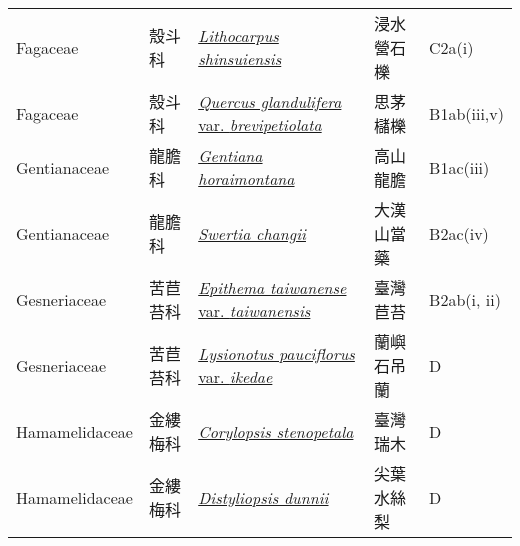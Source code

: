 {\begin{longtable}{L{2.5cm}L{2cm}L{5cm}L{2.5cm}L{3cm}}
    Fagaceae & 殼斗科 & \href{http://www.theplantlist.org/tpl1.1/search?q=Lithocarpus+shinsuiensis}{\textit{Lithocarpus shinsuiensis} } & 浸水營石櫟 & C2a(i)    \\
    Fagaceae & 殼斗科 & \href{http://www.theplantlist.org/tpl1.1/search?q=Quercus+glandulifera+var.+brevipetiolata}{\textit{Quercus glandulifera} var. \textit{brevipetiolata} } & 思茅櫧櫟 & B1ab(iii,v)    \\
    Gentianaceae & 龍膽科 & \href{http://www.theplantlist.org/tpl1.1/search?q=Gentiana+horaimontana}{\textit{Gentiana horaimontana} } & 高山龍膽 & B1ac(iii)    \\
    Gentianaceae & 龍膽科 & \href{http://www.theplantlist.org/tpl1.1/search?q=Swertia+changii}{\textit{Swertia changii} } & 大漢山當藥 & B2ac(iv)    \\
    Gesneriaceae & 苦苣苔科 & \href{http://www.theplantlist.org/tpl1.1/search?q=Epithema+taiwanense+var.+taiwanensis}{\textit{Epithema taiwanense} var. \textit{taiwanensis} } & 臺灣苣苔 & B2ab(i, ii)    \\
    Gesneriaceae & 苦苣苔科 & \href{http://www.theplantlist.org/tpl1.1/search?q=Lysionotus+pauciflorus+var.+ikedae}{\textit{Lysionotus pauciflorus} var. \textit{ikedae} } & 蘭嶼石吊蘭 & D    \\
    Hamamelidaceae & 金縷梅科 & \href{http://www.theplantlist.org/tpl1.1/search?q=Corylopsis+stenopetala}{\textit{Corylopsis stenopetala} } & 臺灣瑞木 & D    \\
    Hamamelidaceae & 金縷梅科 & \href{http://www.theplantlist.org/tpl1.1/search?q=Distyliopsis+dunnii}{\textit{Distyliopsis dunnii} } & 尖葉水絲梨 & D    \\

\end{longtable}}
